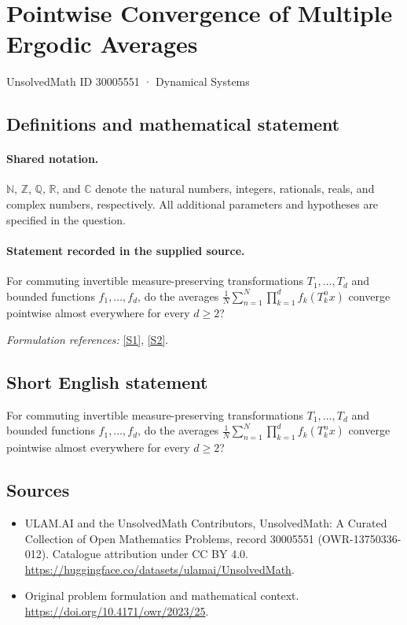 \documentclass[11pt]{article}
\newcommand{\sref}[2]{\hyperlink{source:#1:#2}{[S#2]}}
\begin{document}
\setcounter{section}{30005550}
\section{Pointwise Convergence of Multiple Ergodic Averages}\label{30005551}
{\small UnsolvedMath ID 30005551 · Dynamical Systems}
\subsection{Definitions and mathematical statement}

\paragraph{Shared notation.}$\mathbb N$, $\mathbb Z$, $\mathbb Q$, $\mathbb R$, and $\mathbb C$ denote the natural numbers, integers, rationals, reals, and complex numbers, respectively. All additional parameters and hypotheses are specified in the question.


\paragraph{Statement recorded in the supplied source.}
For commuting invertible measure-preserving transformations $T_1,\ldots,T_d$ and bounded functions $f_1,\ldots,f_d$, do the averages $\frac1N\sum_{n=1}^N\prod_{k=1}^d f_k(T_k^n x)$ converge pointwise almost everywhere for every $d\geq2$?
\par\smallskip\textit{Formulation references:} \sref{30005551}{1}, \sref{30005551}{2}.
\subsection{Short English statement}
For commuting invertible measure-preserving transformations $T_1,\ldots,T_d$ and bounded functions $f_1,\ldots,f_d$, do the averages $\frac1N\sum_{n=1}^N\prod_{k=1}^d f_k(T_k^n x)$ converge pointwise almost everywhere for every $d\geq2$?
\subsection{Sources}
\begin{itemize}
\item[\hypertarget{source:30005551:1}{S1}] ULAM.AI and the UnsolvedMath Contributors, UnsolvedMath: A Curated Collection of Open Mathematics Problems, record 30005551 (OWR-13750336-012). Catalogue attribution under CC BY 4.0.
\url{https://huggingface.co/datasets/ulamai/UnsolvedMath}.
\item[\hypertarget{source:30005551:2}{S2}] Original problem formulation and mathematical context.
\url{https://doi.org/10.4171/owr/2023/25}.
\end{itemize}
\label{end:30005551}
\end{document}
